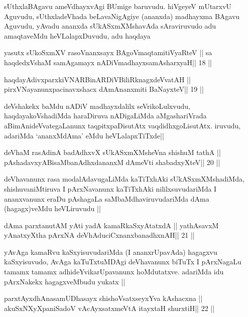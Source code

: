 \begin{artha}
sUthxlaBAgavu ameVdhayxvAgi BUmige baruvudu. hiVgeyeV mUtarxvU
Aguvudu, sUthxladeVhada beLavaNigAgiye (ananxda) madhayxma BAgavu
Aguvudu, yAvadu ananxda sUkASxmXMshavAda sAraviruvudo adu amaqtaveMdu
heVLalapxDuvudu, adu haqdaya
\end{artha}

\begin{shl}
yasutx sUkoSxmXV rasoV\s nanxsayx BAgoV\s maqtamitiVyaRteV ||
sa haqdedxVshaM samAgamayx nADiVmadhayxsamAsharxyaH\hfill || 18 ||
\end{shl}

\begin{shl}
haqdayAdivxparxkiVNARBinARDiVBiliRknagxdeVvatAH ||
pirxVNayanunxpacinavxshacx dAmAnanxmiti BaNayxteV\hfill || 19 ||
\end{shl}

\begin{artha}
deVshakekx baMdu nADiV madhayxdalilx seVrikoLulxvudu,
haqdayakoVshadiMda haraDiruva nADigaLiMda aMgashariVrada
aBimAnideVvategaLanunx taqpitxpaDisutAtx vaqdidhxgoLisutAtx.
iruvudu, adariMda `ananxMdAma' eMdu heVLalapxTiTxde||
\end{artha}

\begin{shl}
deVhaM rasAdinA badAdhxvX sUkASxmXMsheVna shishuM tathA ||
pAshadavxyABisaMbanAdhxdananxM dAmeVti shabadxyXteV\hfill || 20 ||
\end{shl}

\begin{artha}
deVhavanunx rasa modalAdavugaLiMda kaTiTxhAki sUkASxmXMshadiMda,
shishuvaniMtiruva I pArxNavanunx kaTiTxhAki nililxsuvudariMda I
ananxvanunx eraDu pAshagaLa saMbaMdhaviruvudariMda dAma (hagagx)veMdu
heVLiruvudu ||
\end{artha}

\begin{shl}
dAma parxtanutAM yAti yadA kamaRkaSxyAtatxdA ||
yathAsavxM yAnatxyXtha pArxNA deVhAduciCxnanxbanadhxnAH\hfill || 21 ||
\end{shl}

\begin{artha}
yAvAga kamaRvu kaSxyisuvudariMda (I ananxrUpavAda) hagagxvu
kaSxyisuvudo, AvAga kaTuTxtuMDAgi deVhavanunx biTuTx I pArxNagaLu
tamamx tamamx adhideYvikarUpavanunx hoMdutatxve. adariMda idu
pArxNakekx hagagxveMbudu yukatx ||
\end{artha}

\begin{shl}
parxtAyxdhAnasamUDhasayx shishoVsatxseyxYva kAshacxna ||
akuSxNXyXpaniSadoV vAcAyxsatxmeVtA itayxtaH shurxtiH\hfill || 22 ||
\end{shl}


